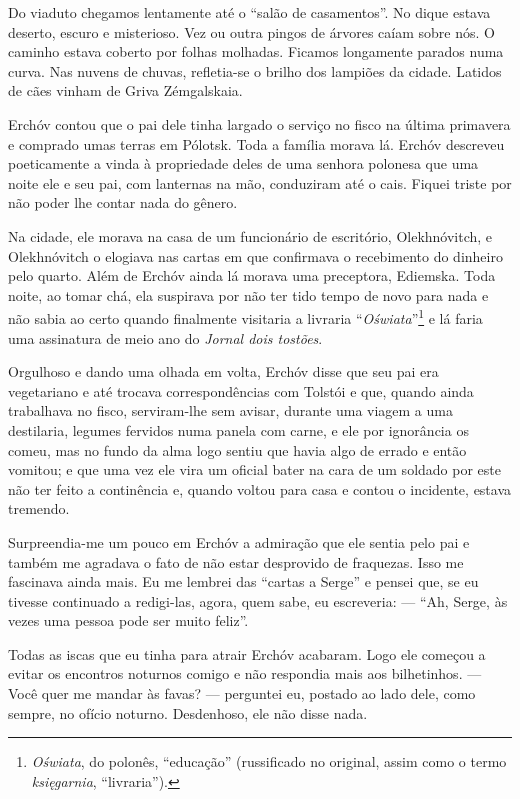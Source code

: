 Do viaduto chegamos lentamente até o ``salão de casamentos''. No dique
estava deserto, escuro e misterioso. Vez ou outra pingos de árvores
caíam sobre nós. O caminho estava coberto por folhas molhadas. Ficamos
longamente parados numa curva. Nas nuvens de chuvas, refletia-se o
brilho dos lampiões da cidade. Latidos de cães vinham de Griva
Zémgalskaia.

Erchóv contou que o pai dele tinha largado o serviço no fisco na última
primavera e comprado umas terras em Pólotsk. Toda a família morava lá.
Erchóv descreveu poeticamente a vinda à propriedade deles de uma senhora
polonesa que uma noite ele e seu pai, com lanternas na mão, conduziram
até o cais. Fiquei triste por não poder lhe contar nada do gênero.

Na cidade, ele morava na casa de um funcionário de escritório,
Olekhnóvitch, e Olekhnóvitch o elogiava nas cartas em que confirmava o
recebimento do dinheiro pelo quarto. Além de Erchóv ainda lá morava uma
preceptora, Ediemska. Toda noite, ao tomar chá, ela suspirava por não
ter tido tempo de novo para nada e não sabia ao certo quando finalmente
visitaria a livraria ``\emph{Oświata}''\footnote{\emph{Oświata}, do
  polonês, ``educação'' (russificado no original, assim como o termo
  \emph{księgarnia}, ``livraria'').} e lá faria uma assinatura de meio
ano do \emph{Jornal dois tostões}.

Orgulhoso e dando uma olhada em volta, Erchóv disse que seu pai era
vegetariano e até trocava correspondências com Tolstói e que, quando
ainda trabalhava no fisco, serviram-lhe sem avisar, durante uma viagem a
uma destilaria, legumes fervidos numa panela com carne, e ele por
ignorância os comeu, mas no fundo da alma logo sentiu que havia algo de
errado e então vomitou; e que uma vez ele vira um oficial bater na cara
de um soldado por este não ter feito a continência e, quando voltou para
casa e contou o incidente, estava tremendo.

Surpreendia-me um pouco em Erchóv a admiração que ele sentia pelo pai e
também me agradava o fato de não estar desprovido de fraquezas. Isso me
fascinava ainda mais. Eu me lembrei das ``cartas a Serge'' e pensei que,
se eu tivesse continuado a redigi-las, agora, quem sabe, eu escreveria:
--- ``Ah, Serge, às vezes uma pessoa pode ser muito feliz''.

Todas as iscas que eu tinha para atrair Erchóv acabaram. Logo ele
começou a evitar os encontros noturnos comigo e não respondia mais aos
bilhetinhos. --- Você quer me mandar às favas? --- perguntei eu, postado
ao lado dele, como sempre, no ofício noturno. Desdenhoso, ele não disse
nada.

